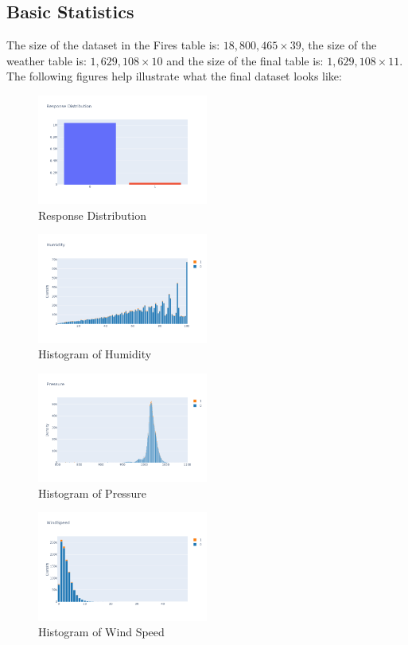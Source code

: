 \documentclass[10pt]{article}
\begin{document}
\subsection{Basic Statistics}
The size of the dataset in the Fires table is: $18,800,465\times 39$,
the size of the weather table is: $1,629,108\times 10$ and
the size of the final table is: $1,629,108\times 11$. The following
figures help illustrate what the final dataset looks like:\par
\begin{figure}[H]
    \centering
    \includegraphics[width=0.5\textwidth]{../res/eda1.png}
    \caption{Response Distribution}
\end{figure}
\begin{figure}[H]
    \centering
    \includegraphics[width=0.5\textwidth]{../res/eda2.png}
    \caption{Histogram of Humidity}
\end{figure}
\begin{figure}[H]
    \centering
    \includegraphics[width=0.5\textwidth]{../res/eda3.png}
    \caption{Histogram of Pressure}
\end{figure}
\begin{figure}[H]
    \centering
    \includegraphics[width=0.5\textwidth]{../res/eda5.png}
    \caption{Histogram of Wind Speed}
\end{figure}
\end{document}
